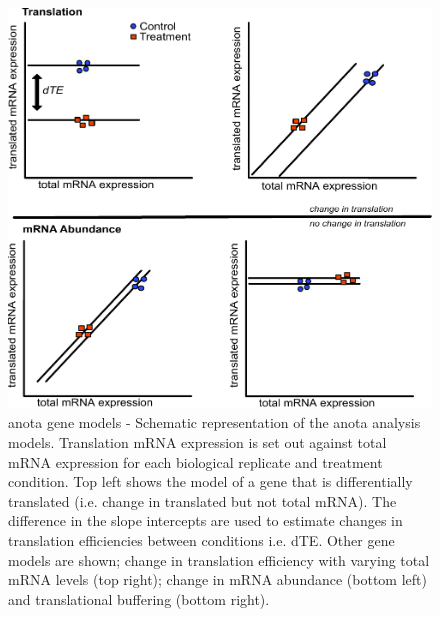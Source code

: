 \documentclass[12pt,openany]{book}
\begin{document}
\begin{figure}
  \includegraphics{./figures/geneModes_anota_Larsson.pdf}
  \caption{anota gene models - Schematic representation of the anota analysis models. Translation mRNA expression is set out against total mRNA expression for each biological replicate and treatment condition. Top left shows the model of a gene that is differentially translated (i.e. change in translated but not total mRNA). The difference in the slope intercepts are used to estimate changes in translation efficiencies between conditions i.e. dTE. Other gene models are shown; change in translation efficiency with varying total mRNA levels (top right); change in mRNA abundance (bottom left) and translational buffering (bottom right).
  \label{fig:anota}}
\end{figure}
\end{document}
